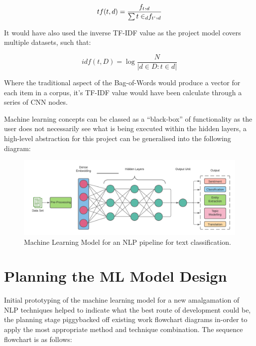 \begin{equation}
    tf(t,d) = \frac{f_t, _d}{\sum{t \in_d} f _t {_`}, _d}
\end{equation}

It would have also used the inverse TF-IDF value as the project model covers multiple datasets, such that:

\begin{equation}
    idf(t, D) = \log \frac{N}{|d \in D : t \in d|}
\end{equation}

Where the traditional aspect of the Bag-of-Words would produce a vector for each item in a corpus, it’s TF-IDF value would have been calculate through a series of CNN nodes.

Machine learning concepts can be classed as a “black-box” of functionality as the user does not necessarily see what is being executed within the hidden layers, a high-level abstraction for this project can be generalised into the following diagram:

\begin{figure}[H]
    \centering
    \includegraphics[width=\textwidth]{figures/chapter-5/MLNLP.pdf}
    \caption[MachineLearningNLP]{Machine Learning Model for an NLP pipeline for text classification.
    \label{fig:MLNLP}}
\end{figure}

\section{Planning the ML Model Design}

Initial prototyping of the machine learning model for a new amalgamation of NLP techniques helped to indicate what the best route of development could be, the planning stage piggybacked off existing work flowchart diagrams in-order to apply the most appropriate method and technique combination. The sequence flowchart is as follows:

